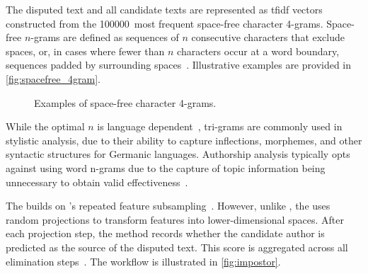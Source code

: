 The disputed text and all candidate texts are represented as \ac{tfidf} vectors constructed from the \num{100000}~most frequent space-free character 4-grams. 
Space-free $n$-grams are defined as sequences of $n$ consecutive characters that exclude spaces, or, in cases where fewer than $n$ characters occur at a word boundary, sequences padded by surrounding spaces~\citep{koppel_authorship_2011,neal_surveying_2018}. 
Illustrative examples are provided in \autoref{fig:spacefree_4gram}.

\begin{figure}[ht]
    \centering
    \caption{Examples of space-free character 4-grams.}
    \label{fig:spacefree_4gram}
\end{figure}

While the optimal $n$ is language dependent~\citep{neal_surveying_2018}, tri-grams are commonly used in stylistic analysis, due to their ability to capture inflections, %
morphemes, %
and other syntactic structures for Germanic languages.
Authorship analysis typically opts against using word n-grams due to the capture of topic information being unnecessary to obtain valid effectiveness~\citep{Sapkota_ngrams_2015}.


The \impAppr{} builds on \unmasking{}'s repeated feature subsampling~\citep{koppel_authorship_2004}. 
However, unlike \unmasking{}, the \impAppr{} uses random projections to transform features into lower-dimensional spaces.
After each projection step, the method records whether the candidate author is predicted as the source of the disputed text. 
This score is aggregated across all elimination steps~\citep{tyo_state_2022}.
The workflow is illustrated in \autoref{fig:impostor}.

